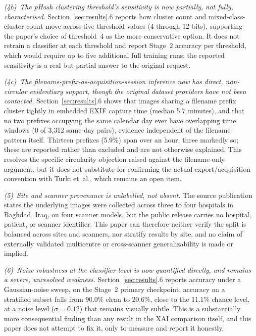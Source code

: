 \textit{(4b)~The pHash clustering threshold's sensitivity is now partially, not fully, characterised.} Section~\ref{sec:results}.6 reports how cluster count and mixed-class-cluster count move across five threshold values (4 through 12 bits), supporting the paper's choice of threshold~4 as the more conservative option. It does not retrain a classifier at each threshold and report Stage~2 accuracy per threshold, which would require up to five additional full training runs; the reported sensitivity is a real but partial answer to the original request.

\textit{(4c)~The filename-prefix-as-acquisition-session inference now has direct, non-circular evidentiary support, though the original dataset providers have not been contacted.} Section~\ref{sec:results}.6 shows that images sharing a filename prefix cluster tightly in embedded EXIF capture time (median 5.7 minutes), and that no two prefixes occupying the same calendar day ever have overlapping time windows (0 of 3,312 same-day pairs), evidence independent of the filename pattern itself. Thirteen prefixes (5.9\%) span over an hour, three markedly so; these are reported rather than excluded and are not otherwise explained. This resolves the specific circularity objection raised against the filename-only argument, but it does not substitute for confirming the actual export/acquisition convention with Turki et~al., which remains an open item.

\textit{(5)~Site and scanner provenance is unlabelled, not absent.} The source publication states the underlying images were collected across three to four hospitals in Baghdad, Iraq, on four scanner models, but the public release carries no hospital, patient, or scanner identifier. This paper can therefore neither verify the split is balanced across sites and scanners, nor stratify results by site, and no claim of externally validated multicentre or cross-scanner generalizability is made or implied.

\textit{(6)~Noise robustness at the classifier level is now quantified directly, and remains a severe, unresolved weakness.} Section~\ref{sec:results}.6 reports accuracy under a Gaussian-noise sweep, on the Stage~2 primary checkpoint: accuracy on a stratified subset falls from 90.0\% clean to 20.6\%, close to the 11.1\% chance level, at a noise level ($\sigma=0.12$) that remains visually subtle. This is a substantially more consequential finding than any result in the XAI comparison itself, and this paper does not attempt to fix it, only to measure and report it honestly.

